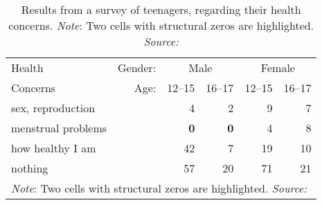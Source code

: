 %
\begin{table}[htb]
\centering
\caption{Results from a survey of teenagers, regarding their health concerns. \emph{Note}: Two cells with structural zeros are highlighted.  \emph{Source:}
  \citet[Table 8-3]{Fienberg:80} }
\label{tab:health}
\begin{tabular}{l|rrrrr}
  \hline
 Health     &  Gender:  &  \multicolumn{2}{c}{Male}  & \multicolumn{2}{c}{Female}  \\
 Concerns   &  Age:     &  12--15  &  16--17  &  12--15  &  16--17  \\
  \hline
  sex, reproduction  &          &       4 &       2 &       9 &       7 \\
  menstrual problems &          & \textbf{0} & \textbf{0} &       4 &       8 \\
  how healthy I am   &          &      42 &       7 &      19 &      10 \\
  nothing            &          &      57 &      20 &      71 &      21 \\
   \hline
\multicolumn{6}{p{.75\textwidth}}{\emph{Note}: Two cells with structural zeros are highlighted.  \emph{Source:}
  \citet[Table 8-3]{Fienberg:80}}
\end{tabular}
\end{table}
%

